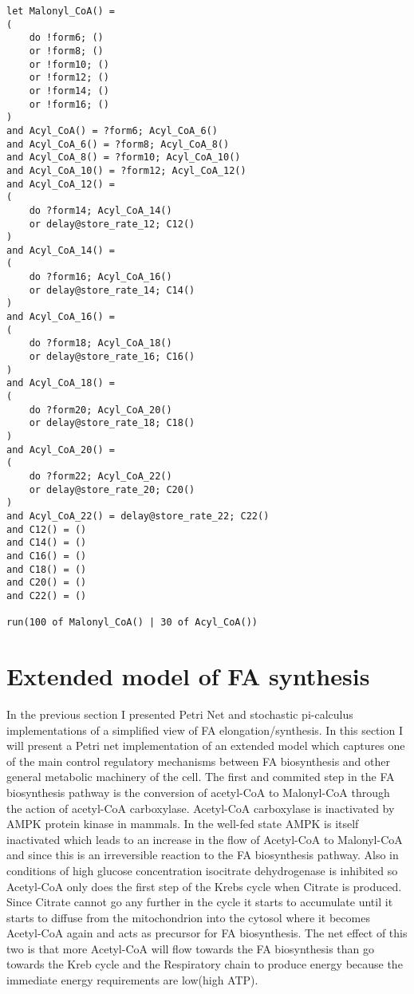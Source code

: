 \begin{verbatim}
let Malonyl_CoA() =
(
	do !form6; ()
	or !form8; ()
	or !form10; ()
	or !form12; ()
	or !form14; ()
	or !form16; ()
)
and Acyl_CoA() = ?form6; Acyl_CoA_6()
and Acyl_CoA_6() = ?form8; Acyl_CoA_8()
and Acyl_CoA_8() = ?form10; Acyl_CoA_10()
and Acyl_CoA_10() = ?form12; Acyl_CoA_12()
and Acyl_CoA_12() =
(
	do ?form14; Acyl_CoA_14()
	or delay@store_rate_12; C12()
)
and Acyl_CoA_14() =
(
	do ?form16; Acyl_CoA_16()
	or delay@store_rate_14; C14()
)
and Acyl_CoA_16() =
(
	do ?form18; Acyl_CoA_18()
	or delay@store_rate_16; C16()
)
and Acyl_CoA_18() =
(
	do ?form20; Acyl_CoA_20()
	or delay@store_rate_18; C18()
)
and Acyl_CoA_20() =
(
	do ?form22; Acyl_CoA_22()
	or delay@store_rate_20; C20()
)
and Acyl_CoA_22() = delay@store_rate_22; C22()
and C12() = ()
and C14() = ()
and C16() = ()
and C18() = ()
and C20() = ()
and C22() = ()

run(100 of Malonyl_CoA() | 30 of Acyl_CoA())
\end{verbatim}


\section{Extended model of FA synthesis}
In the previous section I presented Petri Net and stochastic
pi-calculus implementations of a
simplified view of FA elongation/synthesis. In this section I
will present a Petri net implementation of an extended model which
captures one of the main control regulatory mechanisms between FA
biosynthesis and other general metabolic
machinery of the cell. The first and commited step in the FA
biosynthesis pathway is the conversion of acetyl-CoA to Malonyl-CoA
through the action of acetyl-CoA carboxylase. Acetyl-CoA carboxylase
is inactivated by AMPK protein kinase in mammals. In the well-fed
state AMPK is itself inactivated which leads to an increase in the
flow of Acetyl-CoA to Malonyl-CoA and since this is an irreversible
reaction to the FA biosynthesis pathway.
Also in conditions of high glucose
concentration isocitrate dehydrogenase is inhibited so Acetyl-CoA only
does the first step of the Krebs cycle when Citrate is produced. Since
Citrate cannot go any further in the cycle it starts to accumulate
until it starts to diffuse from the mitochondrion into the cytosol
where it becomes Acetyl-CoA again and acts as precursor for FA
biosynthesis. The net effect of this two is that more Acetyl-CoA will
flow towards the FA biosynthesis than go towards the
Kreb cycle and the Respiratory chain to produce energy because the
immediate energy requirements are low(high ATP).

